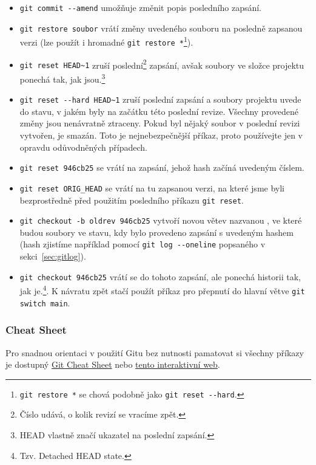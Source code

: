 \documentclass[a4paper,11pt,twoside]{article}
\def\code#1{\textnormal{\texttt{#1}}}
\theoremstyle{red}
\theoremstyle{green}
\begin{document}
    \begin{itemize}
        \item \code{git commit -{}-amend} umožňuje změnit popis posledního zapsání.
        \item \code{git restore soubor} vrátí změny uvedeného souboru na posledně zapsanou verzi (lze použít i hromadné \code{git restore *}\footnote{\code{git restore *} se chová podobně jako \code{git reset -{}-hard}.}).
        \item \code{git reset HEAD\~{}1} zruší poslední\footnote{Číslo udává, o kolik revizí se vracíme zpět.} zapsání, avšak soubory ve složce projektu ponechá tak, jak jsou.\footnote{HEAD vlastně značí ukazatel na poslední zapsání.}
        \item \code{git reset -{}-hard HEAD\~{}1} zruší poslední zapsání a soubory projektu uvede do stavu, v jakém byly na začátku této poslední revize. 
        Všechny provedené změny jsou nenávratně ztraceny.
        Pokud byl nějaký soubor v poslední revizi vytvořen, je smazán.
        Toto je nejnebezpečnější příkaz, proto používejte jen v opravdu odůvodněných případech.
        \item \code{git reset 946cb25} se vrátí na zapsání, jehož hash začíná uvedeným číslem.
        \item \code{git reset ORIG\_HEAD} se vrátí na tu zapsanou verzi, na které jsme byli bezprostředně před použitím posledního příkazu \code{git reset}.
        \item \code{git checkout -b oldrev 946cb25} vytvoří novou větev nazvanou , ve které budou soubory ve stavu, kdy bylo provedeno zapsání s uvedeným hashem (hash zjistíme například pomocí \code{git log -{}-oneline} popsaného v sekci~\ref{sec:gitlog}).
        \item \code{git checkout 946cb25} vrátí se do tohoto zapsání, ale ponechá historii tak, jak je.\footnote{Tzv. Detached HEAD state.}.
            K návratu zpět stačí použít příkaz pro přepnutí do hlavní větve \code{git switch main}.
    \end{itemize}

\subsubsection{Cheat Sheet}
    Pro snadnou orientaci v použití Gitu bez nutnosti pamatovat si všechny příkazy je dostupný \href{https://training.github.com/downloads/github-git-cheat-sheet.pdf}{Git Cheat Sheet} nebo \href{https://ndpsoftware.com/git-cheatsheet.html}{tento interaktivní web}.
\end{document}
